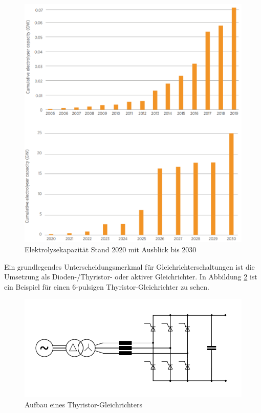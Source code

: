 	\begin{figure}
		\centering
		\includegraphics[width=0.7\linewidth]{content/Grafiken/Ely_Capacity}
		\caption[Elektrolyse Kapazität bis 2030]{Elektrolysekapazität Stand 2020 mit Ausblick bis 2030 \cite{IRENA2020}}
		\label{fig:elycapacity}
	\end{figure}
Ein grundlegendes Unterscheidungsmerkmal für Gleichrichterschaltungen ist die Umsetzung als Dioden-/Thyristor- oder aktiver Gleichrichter. In Abbildung \ref{fig:thyristor} ist ein Beispiel für einen 6-pulsigen Thyristor-Gleichrichter zu sehen.
\begin{figure} 
	\centering
	\includegraphics[width=0.9\linewidth]{content/Grafiken/Thyristor}
	\caption{Aufbau eines Thyristor-Gleichrichters}
	\label{fig:thyristor}
\end{figure}
